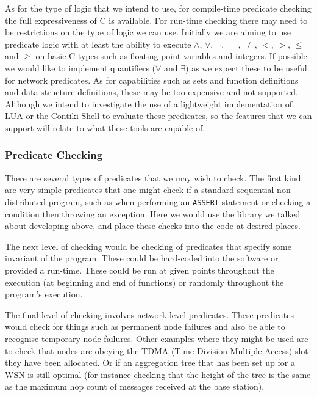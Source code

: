 \documentclass[a4paper]{article}
\begin{document}
As for the type of logic that we intend to use, for compile-time predicate checking the full expressiveness of C is available. For run-time checking there may need to be restrictions on the type of logic we can use. Initially we are aiming to use predicate logic with at least the ability to execute $\land$, $\lor$, $\lnot$, $=$, $\neq$, $<$, $>$, $\leq$ and $\geq$ on basic C types such as floating point variables and integers. If possible we would like to implement quantifiers ($\forall$ and $\exists$) as we expect these to be useful for network predicates. As for capabilities such as sets and function definitions and data structure definitions, these may be too expensive and not supported. Although we intend to investigate the use of a lightweight implementation of LUA \cite{?} or the Contiki Shell \cite{?} to evaluate these predicates, so the features that we can support will relate to what these tools are capable of.

\subsubsection{Predicate Checking}

There are several types of predicates that we may wish to check. The first kind are very simple predicates that one might check if a standard sequential non-distributed program, such as when performing an \verb|ASSERT| statement or checking a condition then throwing an exception. Here we would use the library we talked about developing above, and place these checks into the code at desired places.

The next level of checking would be checking of predicates that specify some invariant of the program. These could be hard-coded into the software or provided a run-time. These could be run at given points throughout the execution (at beginning and end of functions) or randomly throughout the program's execution.

The final level of checking involves network level predicates. These predicates would check for things such as permanent node failures and also be able to recognise temporary node failures. Other examples where they might be used are to check that nodes are obeying the TDMA (Time Division Multiple Access) slot they have been allocated. Or if an aggregation tree \cite{TankBible} that has been set up for a WSN is still optimal (for instance checking that the height of the tree is the same as the maximum hop count of messages received at the base station).
\end{document}
